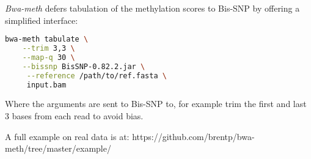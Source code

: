 \documentclass[12pt]{article}
\begin{document}
\textit{Bwa-meth} defers tabulation of the methylation scores to Bis-SNP \cite{bissnp} by offering a simplified interface:
\begin{lstlisting}[language=bash]
bwa-meth tabulate \
    --trim 3,3 \
    --map-q 30 \
    --bissnp BisSNP-0.82.2.jar \
     --reference /path/to/ref.fasta \
     input.bam
\end{lstlisting}
Where the arguments are sent to Bis-SNP to, for example trim the first and last 3 bases
from each read to avoid bias.

A full example on real data is at:
https://github.com/brentp/bwa-meth/tree/master/example/


    
\end{document}
